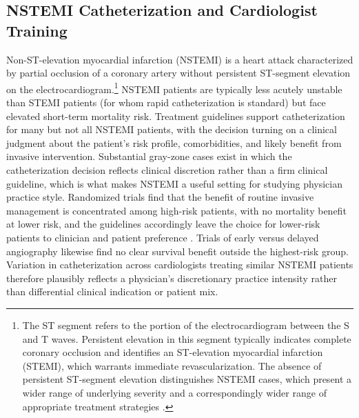\documentclass[12pt]{article}
\begin{document}
\subsection{NSTEMI Catheterization and Cardiologist Training}

Non-ST-elevation myocardial infarction (NSTEMI) is a heart attack characterized by partial occlusion of a coronary artery without persistent ST-segment elevation on the electrocardiogram.\footnote{The ST segment refers to the portion of the electrocardiogram between the S and T waves. Persistent elevation in this segment typically indicates complete coronary occlusion and identifies an ST-elevation myocardial infarction (STEMI), which warrants immediate revascularization. The absence of persistent ST-segment elevation distinguishes NSTEMI cases, which present a wider range of underlying severity and a correspondingly wider range of appropriate treatment strategies \citep{amsterdam2014}.} NSTEMI patients are typically less acutely unstable than STEMI patients (for whom rapid catheterization is standard) but face elevated short-term mortality risk. Treatment guidelines support catheterization for many but not all NSTEMI patients, with the decision turning on a clinical judgment about the patient's risk profile, comorbidities, and likely benefit from invasive intervention. Substantial gray-zone cases exist in which the catheterization decision reflects clinical discretion rather than a firm clinical guideline, which is what makes NSTEMI a useful setting for studying physician practice style. Randomized trials find that the benefit of routine invasive management is concentrated among high-risk patients, with no mortality benefit at lower risk, and the guidelines accordingly leave the choice for lower-risk patients to clinician and patient preference \citep{amsterdam2014}. Trials of early versus delayed angiography likewise find no clear survival benefit outside the highest-risk group. Variation in catheterization across cardiologists treating similar NSTEMI patients therefore plausibly reflects a physician's discretionary practice intensity rather than differential clinical indication or patient mix.
\end{document}
